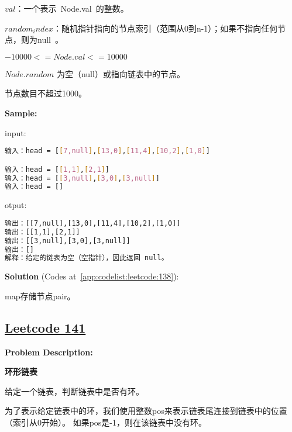 $ val $：一个表示 Node.val 的整数。\par
$ random_index $：随机指针指向的节点索引（范围从0到n-1）；如果不指向任何节点，则为null 。\par

$ -10000 <= Node.val <= 10000 $\par

$ Node.random $ 为空（null）或指向链表中的节点。\par

节点数目不超过1000。\par


\textbf{Sample:}\par

input:\par

\begin{lstlisting}[language=bash]
输入：head = [[7,null],[13,0],[11,4],[10,2],[1,0]]

输入：head = [[1,1],[2,1]]
输入：head = [[3,null],[3,0],[3,null]]
输入：head = []
\end{lstlisting}

otput:\par

\begin{lstlisting}[language=bash]
输出：[[7,null],[13,0],[11,4],[10,2],[1,0]]
输出：[[1,1],[2,1]]
输出：[[3,null],[3,0],[3,null]]
输出：[]
解释：给定的链表为空（空指针），因此返回 null。
\end{lstlisting}

\textbf{Solution }(Codes at~\ref{app:codelist:leetcode:138}):\par

map存储节点pair。\par



\subsection{\href{https://leetcode-cn.com/}{Leetcode 141}}\label{app:problemlist:leetcode:141}

\textbf{Problem Description:}\par

\textbf{环形链表}\par

给定一个链表，判断链表中是否有环。\par

为了表示给定链表中的环，我们使用整数pos来表示链表尾连接到链表中的位置（索引从0开始）。
如果pos是-1，则在该链表中没有环。\par

